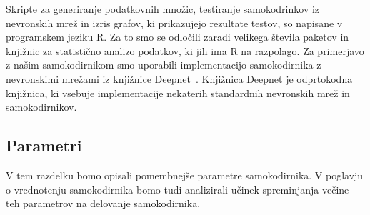 \documentclass[12pt,a4paper,twoside]{article}
\theoremstyle{definition} %
\theoremstyle{plain} %
\numberwithin{equation}{section}  %
\begin{document}
Skripte za generiranje podatkovnih množic, testiranje samokodrinkov iz nevronskih mrež in izris grafov, ki prikazujejo rezultate testov, so napisane v programskem jeziku R.
Za to smo se odločili zaradi velikega števila paketov in knjižnic za statistično analizo podatkov, ki jih ima R na razpolago.
Za primerjavo z našim samokodirnikom smo uporabili implementacijo samokodirnika z nevronskimi mrežami iz knjižnice Deepnet~\cite{deepnet}.
Knjižnica Deepnet je odprtokodna knjižnica, ki vsebuje implementacije nekaterih standardnih nevronskih mrež in samokodirnikov.


\subsection{Parametri}
\label{razdelek-parametri}

V tem razdelku bomo opisali pomembnejše parametre samokodirnika. 
V poglavju o vrednotenju samokodirnika bomo tudi analizirali učinek spreminjanja večine teh parametrov na delovanje samokodirnika.
\end{document}
